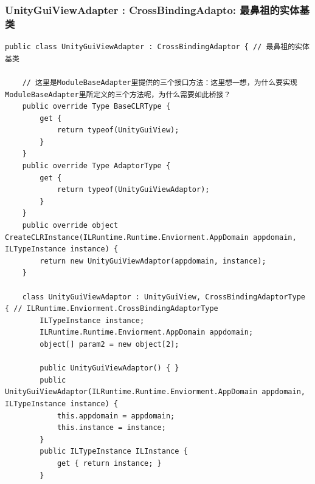 \documentclass[9pt, b5paper]{article}
\begin{document}
\subsubsection{UnityGuiViewAdapter : CrossBindingAdapto: 最鼻祖的实体基类}
\label{sec-6-4-3}
\begin{verbatim}
public class UnityGuiViewAdapter : CrossBindingAdaptor { // 最鼻祖的实体基类

    // 这里是ModuleBaseAdapter里提供的三个接口方法：这里想一想，为什么要实现ModuleBaseAdapter里所定义的三个方法呢，为什么需要如此桥接？
    public override Type BaseCLRType {
        get {
            return typeof(UnityGuiView);
        }
    }
    public override Type AdaptorType {
        get {
            return typeof(UnityGuiViewAdaptor);
        }
    }
    public override object CreateCLRInstance(ILRuntime.Runtime.Enviorment.AppDomain appdomain, ILTypeInstance instance) {
        return new UnityGuiViewAdaptor(appdomain, instance);
    }
    
    class UnityGuiViewAdaptor : UnityGuiView, CrossBindingAdaptorType { // ILRuntime.Enviorment.CrossBindingAdaptorType
        ILTypeInstance instance;
        ILRuntime.Runtime.Enviorment.AppDomain appdomain;
        object[] param2 = new object[2];

        public UnityGuiViewAdaptor() { }
        public UnityGuiViewAdaptor(ILRuntime.Runtime.Enviorment.AppDomain appdomain, ILTypeInstance instance) {
            this.appdomain = appdomain;
            this.instance = instance;
        }
        public ILTypeInstance ILInstance {
            get { return instance; }
        }


\end{verbatim}
\end{document}
